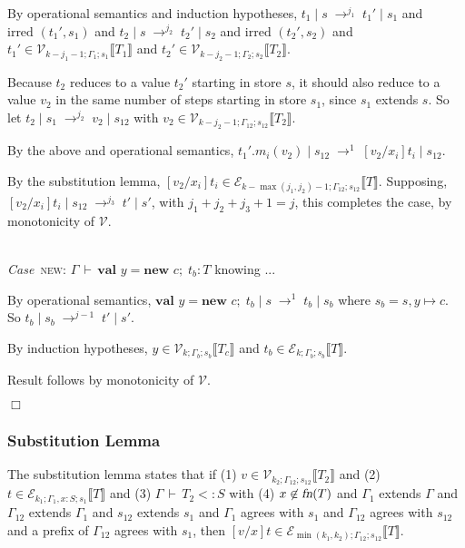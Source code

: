 \documentclass[9pt]{sigplanconf}
\newenvironment{myproof}{{\em Proof:}}{$\Box$}
\newcommand{\Case}{{\em Case\ }}
\newcommand{\ts}{\,\vdash\,}
\newcommand{\fn}{\mbox{\sl fn}}
\newcommand{\sub}{<:}
\newcommand{\subst}[3]{[#1/#2]#3}
\newcommand{\new}[3]{\textbf{val }#1 = \textbf{new }#2 ;\; #3}
\newcommand{\envplus}[1]{, #1}
\newcommand{\relv}[4]{\mathcal{V}_{#1;#2;#3}\llbracket#4\rrbracket}
\newcommand{\rele}[4]{\mathcal{E}_{#1;#2;#3}\llbracket#4\rrbracket}
\newcommand{\irred}[2]{\text{irred }(#1,#2)}
\newcommand{\reductionl}[5]{#1 \operatorname{|} #2 \;\rightarrow^{#5}\; #3 \operatorname{|} #4}
\begin{document}
\begin{myproof}
By operational semantics and induction hypotheses, $\reductionl {t_1}
s {t_1'} {s_1} {j_1}$ and $\irred {t_1'} {s_1}$ and $\reductionl {t_2}
{s} {t_2'} {s_2} {j_2}$ and $\irred {t_2'} {s_2}$ and ${t_1'} \in
\relv {k-j_1-1} {\Gamma_1} {s_1} {T_1}$ and ${t_2'} \in \relv
{k-j_2-1} {\Gamma_2} {s_2} {T_2}$.

Because $t_2$ reduces to a value $t_2'$ starting in store $s$, it
should also reduce to a value $v_2$ in the same number of steps
starting in store $s_1$, since $s_1$ extends $s$. So let $\reductionl
{t_2} {s_1} {v_2} {s_{12}} {j_2}$ with $v_2 \in \relv {k-j_2-1}
{\Gamma_{12}} {s_{12}} {T_2}$.

By the above and operational semantics, $\reductionl {t_1'.m_i(v_2)}
{s_{12}} {\subst {v_2} {x_i} {t_i}} {s_{12}} 1$.

By the substitution lemma, ${\subst {v_2} {x_i} {t_i}} \in \rele
{k-\max(j_1,j_2)-1} {\Gamma_{12}} {s_{12}} {T}$. Supposing,
$\reductionl {\subst {v_2} {x_i} {t_i}} {s_{12}} {t'} {s'} {j_3}$,
with $j_1 + j_2 + j_3 + 1 = j$, this completes the case, by
monotonicity of $\mathcal{V}$.

\ \\

\Case \textsc{new}: $\Gamma \ts \new y c {t_b} : T$ knowing ...

By operational semantics, $\reductionl {\new y c {t_b}} s {t_b} {s_b} 1$
where $s_b = s \envplus{y \mapsto c}$. So $\reductionl {t_b} {s_b} {t'}
{s'} {j-1}$.

By induction hypotheses, $y \in \relv k {\Gamma_b} {s_b} {T_c}$ and $t_b \in
\rele k {\Gamma_b} {s_b} {T}$.

Result follows by monotonicity of $\mathcal{V}$.

\end{myproof}

\subsubsection{Substitution Lemma}

The substitution lemma states that if (1) $v \in \relv {k_2}
{\Gamma_{12}} {s_{12}} {T_2}$ and (2) $t \in \rele {k_1} {\Gamma_1
  \envplus{{x} : S}} {s_1} T$ and (3) $\Gamma \ts {T_2} \sub S$ with
(4) $x \not\in \fn(T)$ and $\Gamma_1$ extends $\Gamma$ and
$\Gamma_{12}$ extends $\Gamma_1$ and $s_{12}$ extends $s_1$ and
$\Gamma_1$ agrees with $s_1$ and $\Gamma_{12}$ agrees with $s_{12}$
and a prefix of $\Gamma_{12}$ agrees with $s_1$, then $\subst {v} {x}
{t} \in \rele {\min(k_1,k_2)} {\Gamma_{12}} {s_{12}} T$.
\end{document}
